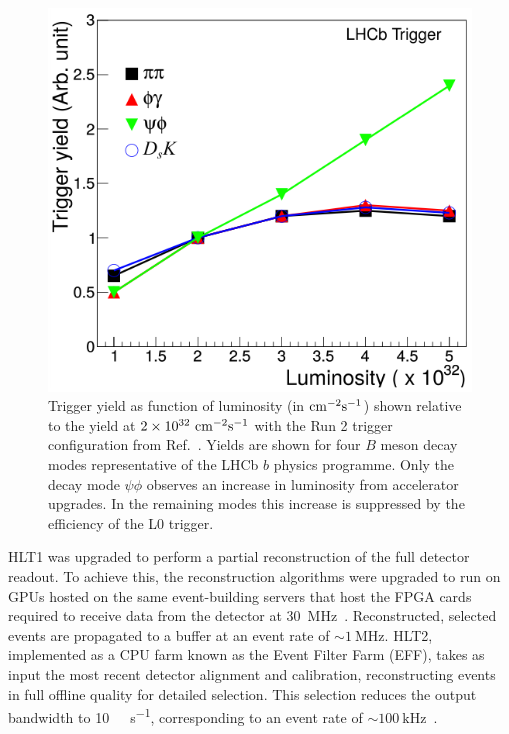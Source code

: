 \begin{figure}[h!]
    \centering
    \includegraphics[width=0.55\linewidth]{images/LHCb-L0-yield.png}
    \caption{Trigger yield as function of luminosity (in ${\rm cm}^{-2}{\rm s}^{-1}$) shown relative to the yield at $2\times 10^{32}~{\rm cm}^{-2}{\rm s}^{-1}$ with the Run 2 trigger configuration from Ref.~\cite{LHCb:upgrade-piucci}. Yields are shown for four $B$ meson decay modes representative of the LHCb $b$ physics programme. Only the decay mode $\psi\phi$ observes an increase in luminosity from accelerator upgrades. In the remaining modes this increase is suppressed by the efficiency of the L0 trigger.}
    \label{fig:LHCbL0TriggerYield}
\end{figure}

HLT1 was upgraded to perform a partial reconstruction of the full detector readout. To achieve this, the reconstruction algorithms were upgraded to run on GPUs hosted on the same event-building servers that host the FPGA cards required to receive data from the detector at \SI{30}{\mega\hertz}~\cite{LHCb_Allen_GPU}. Reconstructed, selected events are propagated to a buffer at an event rate of ${\sim}\SI{1}{\mega\hertz}$. HLT2, implemented as a CPU farm known as the Event Filter Farm (EFF), takes as input the most recent detector alignment and calibration, reconstructing events in full offline quality for detailed selection. This selection reduces the output bandwidth to \SI{10}{\giga\byte\per\second}, corresponding to an event rate of $\sim\SI{100}{\kilo\hertz}$~\cite{lhcb_hlt2_storage_run3}.
